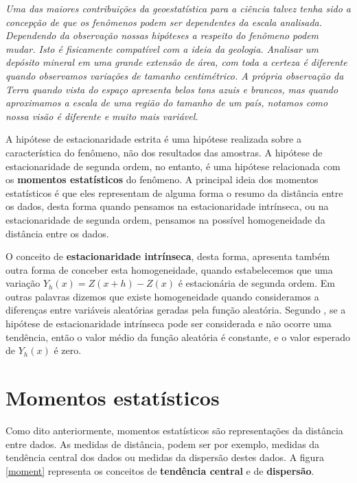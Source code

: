 \begin{proposition}
	\textit{Uma das maiores contribuições da geoestatística para a ciência talvez tenha sido a concepção de que os fenômenos podem ser dependentes da escala analisada. Dependendo da observação nossas hipóteses a respeito do fenômeno podem mudar. Isto é fisicamente compatível com a ideia da geologia. Analisar um depósito mineral em uma grande extensão de área, com toda a certeza é diferente quando observamos variações de tamanho centimétrico. A própria observação da Terra quando vista do espaço apresenta belos tons azuis e brancos, mas quando aproximamos a escala de uma região do tamanho de um país, notamos como nossa visão é diferente e muito mais variável.} 
\end{proposition}

A hipótese de estacionaridade estrita é uma hipótese realizada sobre a característica do fenômeno, não dos resultados das amostras. A hipótese de estacionaridade de segunda ordem, no entanto, é uma hipótese relacionada com os \textbf{momentos estatísticos} do fenômeno. A principal ideia dos momentos estatísticos é que eles representam de alguma forma o resumo da distância entre os dados, desta forma quando pensamos na estacionaridade intrínseca, ou na estacionaridade de segunda ordem, pensamos na possível homogeneidade da distância entre os dados. 

O conceito de \textbf{estacionaridade intrínseca}, desta forma, apresenta também outra forma de conceber esta homogeneidade, quando estabelecemos que uma variação $Y_{h}(x) = Z(x+h) -Z(x)$ é estacionária de segunda ordem. Em outras palavras dizemos que existe homogeneidade quando consideramos a diferenças entre variáveis aleatórias geradas pela função aleatória. Segundo \citet{chiles2009geostatistics}, se a hipótese de estacionaridade intrínseca pode ser considerada e não ocorre uma tendência, então o valor médio da função aleatória é constante, e o valor esperado de $Y_{h}(x)$ é zero. 

\section{Momentos estatísticos} 

Como dito anteriormente, momentos estatísticos são representações da distância entre dados. As medidas de distância, podem ser por exemplo, medidas da tendência central dos dados ou medidas da dispersão destes dados. A figura \ref{moment} representa os conceitos de \textbf{tendência central}  e de \textbf{dispersão}. 

